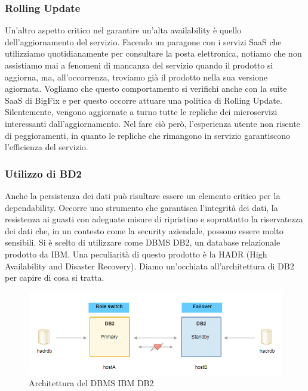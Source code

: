 \subsubsection{Rolling Update}
Un'altro aspetto critico nel garantire un'alta availability è quello dell'aggiornamento del servizio. Facendo un paragone con i servizi SaaS che utilizziamo quotidianamente per consultare la posta elettronica, notiamo che non assistiamo mai a fenomeni di mancanza del servizio quando il prodotto si aggiorna, ma, all'occorrenza, troviamo già il prodotto nella sua versione agiornata. Vogliamo che questo comportamento si verifichi anche con la suite SaaS di BigFix e per questo occorre attuare una politica di Rolling Update. Silentemente, vengono aggiornate a turno tutte le repliche dei microservizi interessanti dall'aggiornamento. Nel fare ciò però, l'esperienza utente non risente di peggioramenti, in quanto le repliche che rimangono in servizio garantiscono l'efficienza del servizio.

\subsubsection{Utilizzo di BD2}
Anche la persistenza dei dati può risultare essere un elemento critico per la dependability. Occorre uno strumento che garantisca l'integrità dei dati, la resistenza ai guasti con adeguate misure di ripristino e soprattutto la riservatezza dei dati che, in un contesto come la security aziendale, possono essere molto sensibili. Si è scelto di utilizzare come DBMS DB2, un database relazionale prodotto da IBM. Una peculiarità di questo prodotto è la HADR (High Availability and Disaster Recovery). Diamo un'occhiata all'architettura di DB2 per capire di cosa si tratta.

\begin{figure}[h!]
	\centering
	\includegraphics[width=\textwidth,keepaspectratio=true]{capitoli/imgs/db2.PNG}
	\caption{Architettura del DBMS IBM DB2}
\end{figure}

